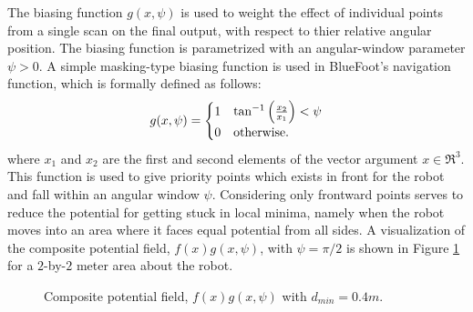 			The biasing function $g(x,\psi)$ is used to weight the effect of individual points from a single scan on the final output, with respect to thier relative angular position. The biasing function is parametrized with an angular-window parameter $\psi>0$. A simple masking-type biasing function is used in BlueFoot's navigation function, which is formally defined as follows:
				\begin{equation}
					g(x,\psi) = 
					\begin{cases}
					1	& \tan^{-1}\left( \frac{x_{2}}{x_{1}} \right) < \psi \\
					0 	& \text{otherwise}.
					\end{cases}
				\end{equation}
			where $x_{1}$ and $x_{2}$ are the first and second elements of the vector argument $x\in\Re^{3}$. This function is used to give priority points which exists in front for the robot and fall within an angular window $\psi$. Considering only frontward points serves to reduce the potential for getting stuck in local minima, namely when the robot moves into an area where it faces equal potential from all sides. A visualization of  the composite potential field, $f(x)g(x,\psi)$, with $\psi=\pi/2$ is shown in Figure \ref{fig::potential_field} for a $2$-by-$2$ meter area about the robot.
				\begin{figure}[t!]
					\centering
					\caption{Composite potential field, $f(x)g(x,\psi)$ with $d_{min}=0.4m$.}
					\label{fig::potential_field}
				\end{figure}

